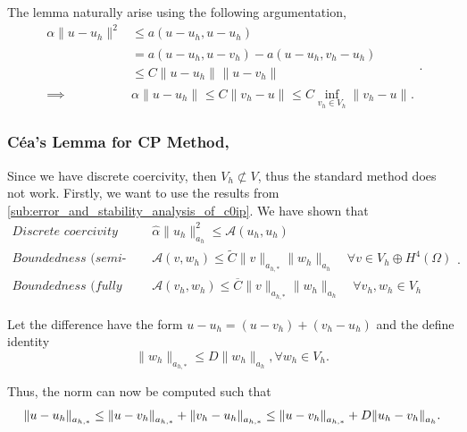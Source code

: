 The lemma naturally arise using the following argumentation,
\begin{equation}
\label{eq:cealemma_proof}
    \begin{split}
\alpha \| u - u_{h} \|_{  }^{  2} & \le a\left( u-u_{h}, u - u_{h} \right) \\
&= a\left( u - u_{h}, u - v_{h} \right)  - a\left( u - u_{h}, v_{h} - u_{h} \right)  \\
& \le  C\| u - u_{h} \|_{  }^{  } \| u - v_{h} \|_{  }^{  } \\
\implies &  \alpha \| u - u_{h} \|_{  }^{  }    \le  C \| v_{h} - u \|_{  }^{  } \le C \inf_{v_{h} \in V_{h}} \| v_{h} -u \|_{  }^{  }.
    \end{split}
.\end{equation}

\subsubsection{Céa's Lemma for CP Method, }%
\label{ssub:ceas_lemma}
Since we have discrete coercivity, then $V_{h} \not \subset V$, thus the standard method does not work. Firstly, we want to use the results from \ref{sub:error_and_stability_analysis_of_c0ip}. We have shown that
\begin{equation*}
    \begin{split}
    \textit{Discrete coercivity } \quad & \hat{\alpha } \| u_{h} \|_{ a_{h} }^{ 2 }  \le  \mathcal{A} \left( u_{h}, u_{h} \right) \\
    \textit{Boundedness (semi-discrete) }\quad  & \mathcal{A} \left( v,w_{h} \right)  \le  \widetilde{C} \| v \|_{ a_{h,*} }^{  }  \| w_{h} \|_{ a_{h} }^{  } \quad \forall v \in  V_{h} \oplus H^{4}\left( \Omega  \right) \\
    \textit{Boundedness (fully discrete) }\quad  & \mathcal{A} \left( v_{h},w_{h} \right)  \le  \overline{C}  \| v \|_{ a_{h,*} }^{  }  \| w_{h} \|_{ a_{h} }^{  } \quad \forall v_{h}, w_{h} \in V_{h}
    \end{split}
.\end{equation*}

Let the difference have the form $u - u_{h} = (u - v_{h} )  + (v_{h} - u_{h})$ and the define identity
$$
\| w_{h} \|_{ a_{h,*} }^{  }  \le  D \| w_{h} \|_{ a_{h} }^{  }, \forall w_{h} \in V_{h} .
$$


Thus, the norm can now be computed such that\[
\| u - u_{h} \|_{ a_{h,*} }^{  } \le \|u - v_{h}  \|_{a_{h,*}  }^{  }  + \| v_{h} - u_{h} \|_{a_{h,*}  }^{  } \\
\le \| u -v_{h} \|_{ a_{h,*} }^{  }  + D \| u_{h} - v_{h} \|_{a_{h}  }^{  }.
\]

